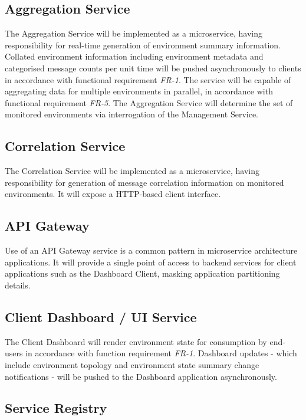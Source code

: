 \subsection{Aggregation Service}
The Aggregation Service will be implemented as a microservice, having responsibility for real-time generation of environment summary information. Collated environment information including environment metadata and categorised message counts  per unit time will be pushed asynchronously to clients in accordance with functional requirement \textit{FR-1}. The service will be capable of aggregating data for multiple environments in parallel, in accordance with functional requirement \textit{FR-5}. The Aggregation Service will determine the set of monitored environments via interrogation of the Management Service.

\subsection{Correlation Service}
The Correlation	 Service will be implemented as a microservice, having responsibility for generation of message correlation information on monitored environments. It will expose a HTTP-based client interface.

\subsection{API Gateway}

Use of an API Gateway service is a common pattern in microservice architecture applications. It will provide a single point of access to backend services for client applications such as the Dashboard Client, masking application partitioning details.

\subsection{Client Dashboard / UI Service}

The Client Dashboard will render environment state for consumption by end-users in accordance with function requirement \textit{FR-1}. Dashboard updates - which include environment topology and environment state summary change notifications - will be pushed to the Dashboard application asynchronously.

\subsection{Service Registry}

